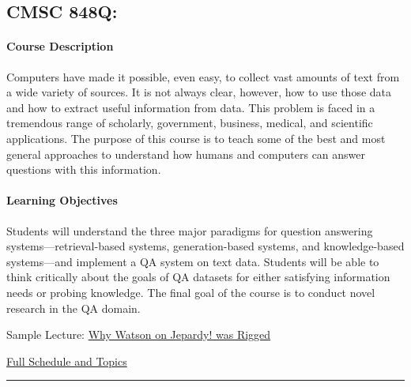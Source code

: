 \documentclass{article}
\begin{document}
\subsection{CMSC 848Q: }

\paragraph{Course Description}
Computers have made it possible, even easy, to collect vast amounts of text from a wide variety of sources. It is not always clear, however, how to use those data and how to extract useful information from data. This problem is faced in a tremendous range of scholarly, government, business, medical, and scientific applications. The purpose of this course is to teach some of the best and most general approaches to understand how humans and computers can answer questions with this information.


\paragraph{Learning Objectives}
Students will understand the three major paradigms for question answering systems---retrieval-based systems, generation-based systems, and knowledge-based systems---and implement a QA system on text data.  Students will be able to think critically about the goals of QA datasets for either satisfying information needs or probing knowledge.  The final goal of the course is to conduct novel research in the QA domain.

\begin{itemize*}
\item Sample Lecture: \href{https://www.youtube.com/watch?v=WCIFUJ5oeRA}{Why Watson on Jepardy! was Rigged}
  \item \href{http://users.umiacs.umd.edu/~jbg/teaching/CMSC_848/}{Full Schedule and Topics}
  \end{itemize*}




\clearpage




\noindent\rule{4cm}{0.4pt}
\end{document}
